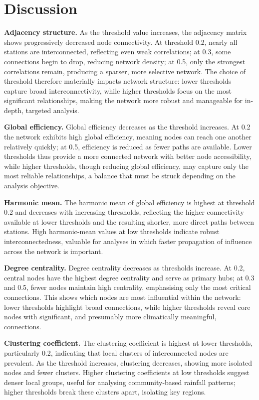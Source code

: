 \documentclass[11pt]{article}
\begin{document}
\section{Discussion}

\textbf{Adjacency structure.} As the threshold value increases, the adjacency matrix shows
progressively decreased node connectivity. At threshold 0.2, nearly all stations are interconnected,
reflecting even weak correlations; at 0.3, some connections begin to drop, reducing network density;
at 0.5, only the strongest correlations remain, producing a sparser, more selective network. The
choice of threshold therefore materially impacts network structure: lower thresholds capture broad
interconnectivity, while higher thresholds focus on the most significant relationships, making the
network more robust and manageable for in-depth, targeted analysis.

\textbf{Global efficiency.} Global efficiency decreases as the threshold increases. At 0.2 the network
exhibits high global efficiency, meaning nodes can reach one another relatively quickly; at 0.5,
efficiency is reduced as fewer paths are available. Lower thresholds thus provide a more connected
network with better node accessibility, while higher thresholds, though reducing global efficiency,
may capture only the most reliable relationships, a balance that must be struck depending on the
analysis objective.

\textbf{Harmonic mean.} The harmonic mean of global efficiency is highest at threshold 0.2 and
decreases with increasing thresholds, reflecting the higher connectivity available at lower
thresholds and the resulting shorter, more direct paths between stations. High harmonic-mean values at
low thresholds indicate robust interconnectedness, valuable for analyses in which faster propagation
of influence across the network is important.

\textbf{Degree centrality.} Degree centrality decreases as thresholds increase. At 0.2, central nodes
have the highest degree centrality and serve as primary hubs; at 0.3 and 0.5, fewer nodes maintain high
centrality, emphasising only the most critical connections. This shows which nodes are most
influential within the network: lower thresholds highlight broad connections, while higher
thresholds reveal core nodes with significant, and presumably more climatically meaningful,
connections.

\textbf{Clustering coefficient.} The clustering coefficient is highest at lower thresholds,
particularly 0.2, indicating that local clusters of interconnected nodes are prevalent. As the
threshold increases, clustering decreases, showing more isolated nodes and fewer clusters. Higher
clustering coefficients at low thresholds suggest denser local groups, useful for analysing
community-based rainfall patterns; higher thresholds break these clusters apart, isolating key
regions.
\end{document}
